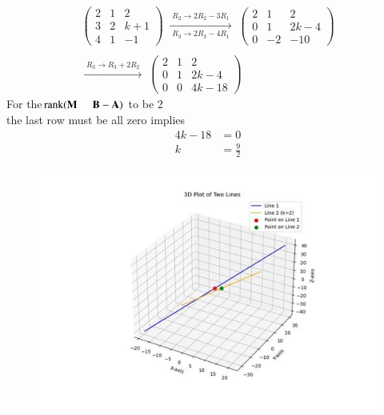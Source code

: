 \documentclass[journal]{IEEEtran}
\begin{document}
\begin{align}
\begin{pmatrix}
2 & 1 & 2\\
3 & 2 & k+1\\
4 & 1 & -1
\end{pmatrix}
\;\xrightarrow[\;R_3 \to 2R_3 - 4R_1\;]{\;R_2 \to 2R_2 - 3R_1\;}\;
\begin{pmatrix}
2 & 1 & 2\\
0 & 1 & 2k-4\\
0 & -2 & -10
\end{pmatrix}\\
\;\\\xrightarrow[\;]{\;R_3 \to R_3 + 2R_2\;}\;
\begin{pmatrix}
2 &1 & 2\\
0 & 1 & 2k-4\\
0 & 0 & 4k-18
\end{pmatrix}\end{align}
For the$ \operatorname{rank}(\vec{M} \hspace{5mm}  \vec{B-A})$ to be 2\\
the last row must be all zero implies\\
\begin{align}
4k-18&=0\\
k&=\tfrac{9}{2}
\end{align}


\begin{figure}[h]
    \centering
\includegraphics[scale=0.5]{figs/4.13.85.png}
    \caption{}
    \label{fig:1}
\end{figure}
\end{document}
